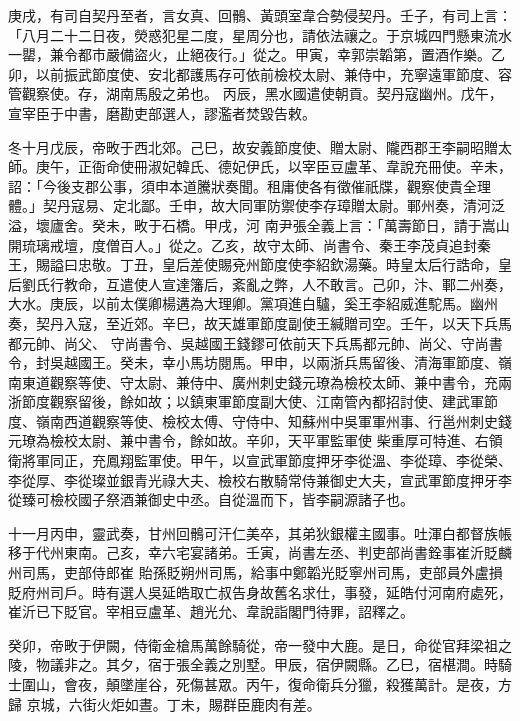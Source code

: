 \begin{pinyinscope}
 庚戌，有司自契丹至者，言女真、回鶻、黃頭室韋合勢侵契丹。壬子，有司上言：「八月二十二日夜，熒惑犯星二度，星周分也，請依法禳之。于京城四門懸東流水一罌，兼令都市嚴備盜火，止絕夜行。」從之。甲寅，幸郭崇韜第，置酒作樂。乙卯，以前振武節度使、安北都護馬存可依前檢校太尉、兼侍中，充寧遠軍節度、容管觀察使。存，湖南馬殷之弟也。
 丙辰，黑水國遣使朝貢。契丹寇幽州。戊午，宣宰臣于中書，磨勘吏部選人，謬濫者焚毀告敕。



 冬十月戊辰，帝畋于西北郊。己巳，故安義節度使、贈太尉、隴西郡王李嗣昭贈太師。庚午，正衙命使冊淑妃韓氏、德妃伊氏，以宰臣豆盧革、韋說充冊使。辛未，詔：「今後支郡公事，須申本道騰狀奏聞。租庸使各有徵催祇牒，觀察使貴全理體。」契丹寇易、定北鄙。壬申，故大同軍防禦使李存璋贈太尉。鄆州奏，清河泛溢，壞廬舍。癸未，畋于石橋。甲戌，河
 南尹張全義上言：「萬壽節日，請于嵩山開琉璃戒壇，度僧百人。」從之。乙亥，故守太師、尚書令、秦王李茂貞追封秦王，賜謚曰忠敬。丁丑，皇后差使賜兗州節度使李紹欽湯藥。時皇太后行誥命，皇后劉氏行教命，互遣使人宣達籓后，紊亂之弊，人不敢言。己卯，汴、鄆二州奏，大水。庚辰，以前太僕卿楊遘為大理卿。黨項進白驢，奚王李紹威進駝馬。幽州奏，契丹入寇，至近郊。辛巳，故天雄軍節度副使王緘贈司空。壬午，以天下兵馬都元帥、尚父、
 守尚書令、吳越國王錢鏐可依前天下兵馬都元帥、尚父、守尚書令，封吳越國王。癸未，幸小馬坊閱馬。甲申，以兩浙兵馬留後、清海軍節度、嶺南東道觀察等使、守太尉、兼侍中、廣州刺史錢元璙為檢校太師、兼中書令，充兩浙節度觀察留後，餘如故；以鎮東軍節度副大使、江南管內都招討使、建武軍節度、嶺南西道觀察等使、檢校太傅、守侍中、知蘇州中吳軍軍州事、行邕州刺史錢元璙為檢校太尉、兼中書令，餘如故。辛卯，天平軍監軍使
 柴重厚可特進、右領衛將軍同正，充鳳翔監軍使。甲午，以宣武軍節度押牙李從溫、李從璋、李從榮、李從厚、李從璨並銀青光祿大夫、檢校右散騎常侍兼御史大夫，宣武軍節度押牙李從臻可檢校國子祭酒兼御史中丞。自從溫而下，皆李嗣源諸子也。



 十一月丙申，靈武奏，甘州回鶻可汗仁美卒，其弟狄銀權主國事。吐渾白都督族帳移于代州東南。己亥，幸六宅宴諸弟。壬寅，尚書左丞、判吏部尚書銓事崔沂貶麟州司馬，吏部侍郎崔
 貽孫貶朔州司馬，給事中鄭韜光貶寧州司馬，吏部員外盧損貶府州司戶。時有選人吳延皓取亡叔告身故舊名求仕，事發，延皓付河南府處死，崔沂已下貶官。宰相豆盧革、趙光允、韋說詣閣門待罪，詔釋之。



 癸卯，帝畋于伊闕，侍衛金槍馬萬餘騎從，帝一發中大鹿。是日，命從官拜梁祖之陵，物議非之。其夕，宿于張全義之別墅。甲辰，宿伊闕縣。乙巳，宿椹澗。時騎士圍山，會夜，顛墜崖谷，死傷甚眾。丙午，復命衛兵分獵，殺獲萬計。是夜，方歸
 京城，六街火炬如晝。丁未，賜群臣鹿肉有差。




\end{pinyinscope}
